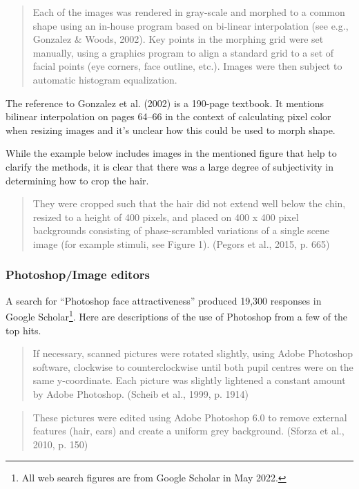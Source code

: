 \documentclass[
  doc,floatsintext]{apa6}
\begin{document}
\begin{quote}
Each of the images was rendered in gray-scale and morphed to a common shape using an in-house program based on bi-linear interpolation (see e.g., Gonzalez \& Woods, 2002). Key points in the morphing grid were set manually, using a graphics program to align a standard grid to a set of facial points (eye corners, face outline, etc.). Images were then subject to automatic histogram equalization.
\end{quote}

The reference to Gonzalez et al. (2002) is a 190-page textbook. It mentions bilinear interpolation on pages 64--66 in the context of calculating pixel color when resizing images and it's unclear how this could be used to morph shape.

While the example below includes images in the mentioned figure that help to clarify the methods, it is clear that there was a large degree of subjectivity in determining how to crop the hair.

\begin{quote}
They were cropped such that the hair did not extend well below the chin, resized to a height of 400 pixels, and placed on 400 x 400 pixel backgrounds consisting of phase-scrambled variations of a single scene image (for example stimuli, see Figure 1). (Pegors et al., 2015, p. 665)
\end{quote}

\hypertarget{photoshopimage-editors}{%
\subsubsection{Photoshop/Image editors}\label{photoshopimage-editors}}

A search for ``Photoshop face attractiveness'' produced 19,300 responses in Google Scholar\footnote{All web search figures are from Google Scholar in May 2022.}. Here are descriptions of the use of Photoshop from a few of the top hits.

\begin{quote}
If necessary, scanned pictures were rotated slightly, using Adobe Photoshop software, clockwise to counterclockwise until both pupil centres were on the same y-coordinate. Each picture was slightly lightened a constant amount by Adobe Photoshop. (Scheib et al., 1999, p. 1914)
\end{quote}

\begin{quote}
These pictures were edited using Adobe Photoshop 6.0 to remove external features (hair, ears) and create a uniform grey background. (Sforza et al., 2010, p. 150)
\end{quote}
\end{document}
